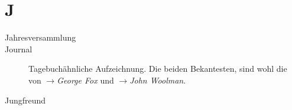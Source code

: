 \section*{J}

\articlesize

\begin{description}
 \item[Jahresversammlung]


 \item[Journal] Tagebuchähnliche Aufzeichnung. Die beiden Bekantesten, sind wohl die von $\to$\textit{George Fox} und $\to$\textit{John Woolman}.

 \item[Jungfreund]
 \end{description}

\normalsize